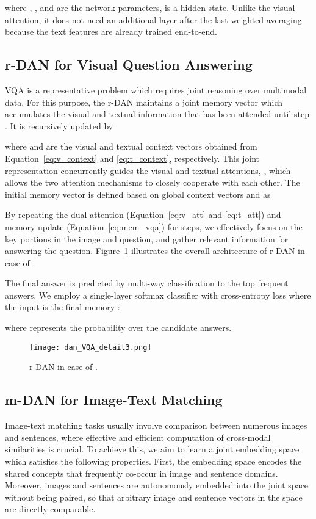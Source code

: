 \documentclass[10pt,twocolumn,letterpaper]{article}
\begin{document}
where , , and  are the network parameters,  is a hidden state.
Unlike the visual attention, it does not need an additional layer after the last weighted averaging because the text features  are already trained end-to-end.

\subsection{r-DAN for Visual Question Answering}
\label{sub:vqa}
VQA is a representative problem which requires joint reasoning over multimodal data.
For this purpose, the r-DAN maintains a joint memory vector  which accumulates the visual and textual information that has been attended until step .
It is recursively updated by 

where  and  are the visual and textual context vectors obtained from Equation~\ref{eq:v_context} and \ref{eq:t_context}, respectively.
This joint representation concurrently guides the visual and textual attentions, \ie , which allows the two attention mechanisms to closely cooperate with each other.
The initial memory vector  is defined based on global context vectors  and  as

By repeating the dual attention (Equation~\ref{eq:v_att} and \ref{eq:t_att}) and memory update (Equation~\ref{eq:mem_vqa}) for  steps, we effectively focus on the key portions  in the image and question, and gather relevant information for answering the question.
Figure~\ref{fig:dan_vqa_detail} illustrates the overall architecture of r-DAN in case of .

The final answer is predicted by multi-way classification to the top  frequent answers.
We employ a single-layer softmax classifier with cross-entropy loss where the input is the final memory :

where  represents the probability over the candidate answers.

\begin{figure}[t]
\begin{center}
\texttt{[image: dan\_VQA\_detail3.png]}
\caption{
r-DAN in case of .
}
\label{fig:dan_vqa_detail}
\vspace{-5mm}
\end{center}
\end{figure}

\subsection{m-DAN for Image-Text Matching}
\label{sub:matching}
Image-text matching tasks usually involve comparison between numerous images and sentences, where effective and efficient computation of cross-modal similarities is crucial.
To achieve this, we aim to learn a joint embedding space which satisfies the following properties.
First, the embedding space encodes the shared concepts that frequently co-occur in image and sentence domains.
Moreover, images and sentences are autonomously embedded into the joint space without being paired, so that arbitrary image and sentence vectors in the  space are directly comparable.
\end{document}
